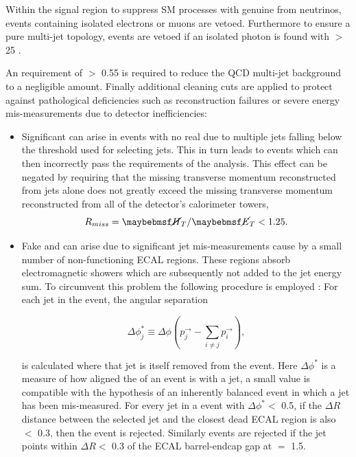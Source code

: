 Within the signal region to suppress \ac{SM} processes with genuine \met from neutrinos, events containing isolated electrons or muons are vetoed. Furthermore to ensure a pure multi-jet topology, events are vetoed if an isolated photon is found with \pt $>$ 25 \GeV. 

An \alphat requirement of $>$ 0.55 is required to reduce the QCD multi-jet background to a negligible amount. Finally additional cleaning cuts are applied to protect against pathological deficiencies such as reconstruction failures or severe energy mis-measurements due to detector inefficiencies:

\begin{itemize}
\item Significant \mht can arise in events with no real \met due to multiple jets falling below the \pt threshold used for selecting jets. This in turn leads to events which can then incorrectly pass the \alphat requirements of the analysis. This effect can be negated by requiring that the missing transverse momentum reconstructed from jets alone does not greatly exceed the missing transverse momentum reconstructed from all of the detector's calorimeter towers,
\begin{equation}
R_{miss} = \mht / \met < 1.25. \nonumber
\end{equation}  

\item Fake \met and \mht can arise due to significant jet mis-measurements cause by a small number of non-functioning \ac{ECAL} regions. These regions absorb electromagnetic showers which are subsequently not added to the jet energy sum. To circumvent this problem the following procedure is employed : For each jet in the event, the angular separation

\begin{equation}
\Delta\phi_{j}^{*}\equiv \Delta\phi(p_{j}^{\rightarrow}-\sum_{i\neq j}p_{i}^{\rightarrow}),
\end{equation}

is calculated where that jet is itself removed from the event. Here $\Delta\phi^{*}$ is a measure of how aligned the \mht of an event is with a jet, a small value is compatible with the hypothesis of an inherently balanced event in
which a jet has been mis-measured. For every jet in a event with $\Delta\phi^{*} <$ 0.5, if the $\Delta R$ distance between the selected jet and the closest dead \ac{ECAL} region is also $<$ 0.3, then the event is rejected. Similarly events are rejected if the jet points within $\Delta R <$ 0.3 of the \ac{ECAL} barrel-endcap gap at \abeta $=$ 1.5.

\end{itemize}

